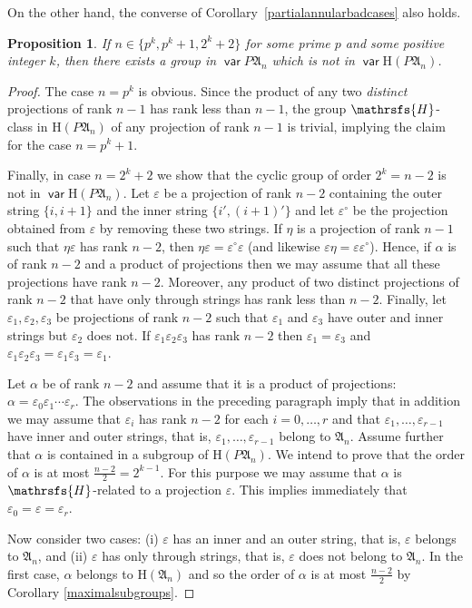 \documentclass[11pt,reqno]{amsart}
\DeclareMathOperator{\var}{\mathsf{var}}
\numberwithin{equation}{section}
\newtheorem{Prop}[Thm]{Proposition}
\theoremstyle{remark}
\def\Hc{\mathrsfs{H}}
\def\al{\alpha}
\def\ep{\varepsilon}
\def\H{\mathrm H}
\def\A{\mathfrak{A}}
\begin{document}
On the other hand, the converse of
Corollary~\ref{partialannularbadcases} also holds.

\begin{Prop}
\label{partialannulargoodcases} If $n\in\{p^k,p^k+1,2^k+2\}$ for
some prime $p$ and some positive integer $k$, then there exists a
group in $\var P\A_n$ which is not in $\var\H(P\A_n)$.
\end{Prop}

\begin{proof} The case $n=p^k$ is obvious. Since the product of any two
\emph{distinct} projections of rank $n-1$ has rank less than
$n-1$, the group $\Hc$-class in $\H(P\A_n)$ of any projection of
rank $n-1$ is trivial, implying the claim for the case $n=p^k+1$.

Finally, in case $n=2^k+2$ we show that the cyclic group of order
$2^k=n-2$ is not in $\var\H(P\A_n)$. Let $\ep$ be a projection of
rank $n-2$ containing the outer string $\{i,i+1\}$ and the inner
string $\{i',(i+1)'\}$ and let $\ep^\circ$ be the projection
obtained from $\ep$ by removing these two strings. If $\eta$ is a
projection of rank $n-1$ such that $\eta\ep$ has rank $n-2$, then
$\eta\ep=\ep^\circ\ep$ (and likewise $\ep\eta=\ep\ep^\circ$).
Hence, if $\al$ is of rank $n-2$ and a product of projections then
we may assume that all these projections have rank  $n-2$.
Moreover, any product of two distinct projections of rank $n-2$
that have only through strings has rank less than $n-2$. Finally,
let $\ep_1, \ep_2, \ep_3$ be projections of rank $n-2$ such that
$\ep_1$ and $\ep_3$ have outer and inner strings but $\ep_2$ does
not. If $\ep_1\ep_2\ep_3$ has rank $n-2$ then $\ep_1=\ep_3$ and
$\ep_1\ep_2\ep_3=\ep_1\ep_3=\ep_1$.

Let $\alpha$ be of rank $n-2$ and assume that it is a product of
projections: $\alpha=\ep_0\ep_1\cdots \ep_r$. The observations in
the preceding paragraph imply that in addition we may assume that
$\ep_i$ has rank $n-2$ for each $i=0,\dots,r$ and that
$\ep_1,\dots, \ep_{r-1}$ have inner and outer strings, that is,
$\ep_1,\dots, \ep_{r-1}$ belong to $\A_n$. Assume further that
$\alpha$ is contained in a subgroup of $\H (P\A_n)$. We intend to
prove that the order of $\alpha$ is at most $\frac{n-2}2=2^{k-1}$.
For this purpose we may assume that $\alpha$ is $\Hc$-related to a
projection $\ep$. This implies immediately that $\ep_0=\ep=\ep_r$.

Now consider two cases: (i) $\ep$ has an inner and an outer
string, that is, $\ep$ belongs to $\A_n$, and (ii) $\ep$ has only
through strings, that is, $\ep$ does not belong to $\A_n$. In the
first case, $\alpha$ belongs to $\H(\A_n)$ and so the order of
$\alpha$ is at most $\frac{n-2}2$ by Corollary
\ref{maximalsubgroups}.


\end{proof}
\end{document}
